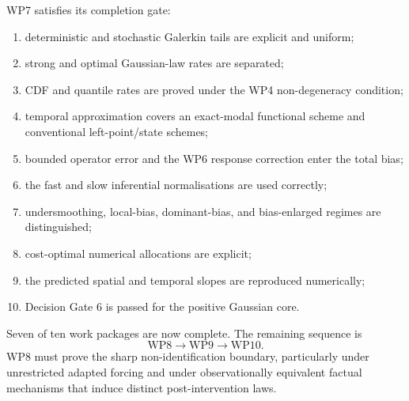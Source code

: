 \documentclass[11pt]{article}
\theoremstyle{remark}
\begin{document}
WP7 satisfies its completion gate:
\begin{enumerate}[label=(\roman*)]
 \item deterministic and stochastic Galerkin tails are explicit and uniform;
 \item strong and optimal Gaussian-law rates are separated;
 \item CDF and quantile rates are proved under the WP4 non-degeneracy condition;
 \item temporal approximation covers an exact-modal functional scheme and conventional left-point/state schemes;
 \item bounded operator error and the WP6 response correction enter the total bias;
 \item the fast and slow inferential normalisations are used correctly;
 \item undersmoothing, local-bias, dominant-bias, and bias-enlarged regimes are distinguished;
 \item cost-optimal numerical allocations are explicit;
 \item the predicted spatial and temporal slopes are reproduced numerically;
 \item Decision Gate 6 is passed for the positive Gaussian core.
\end{enumerate}

Seven of ten work packages are now complete. The remaining sequence is
\[
 \boxed{
 \mathrm{WP8}\longrightarrow\mathrm{WP9}\longrightarrow\mathrm{WP10}
 }.
\]
WP8 must prove the sharp non-identification boundary, particularly under unrestricted adapted forcing and under observationally equivalent factual mechanisms that induce distinct post-intervention laws.
\end{document}
